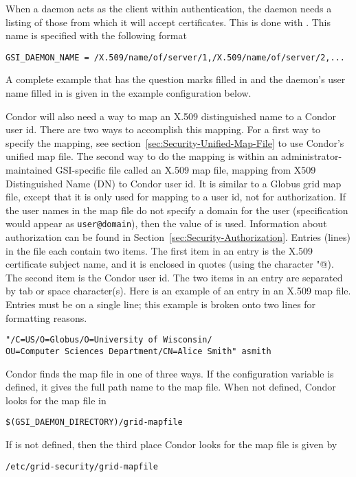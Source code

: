 \begin{description}
When a daemon acts as the client within authentication,
the daemon needs a listing of those from which it
will accept certificates.
This is done with .
This name is specified with the following format
\footnotesize
\begin{verbatim}
GSI_DAEMON_NAME = /X.509/name/of/server/1,/X.509/name/of/server/2,...
\end{verbatim}
\normalsize

A complete example that has the question marks filled in and the
daemon's user name filled in is given in the 
example configuration below.

Condor will also need a way to map an X.509 distinguished
name to a Condor user id.
There are two ways to accomplish this mapping.
For a first way to specify the mapping, see
section~\ref{sec:Security-Unified-Map-File}
to use Condor's unified map file.
The second way to do the mapping is within
an administrator-maintained GSI-specific file called an X.509 map file,
mapping from X509 Distinguished Name (DN) to Condor user id.
It is similar to a Globus grid map file, except that it is only used for
mapping to a user id, not for authorization. 
If the user names in the
map file do not specify a domain for the user
(specification would appear as \verb|user@domain|),
then the value of  is used.
Information about authorization can be found in
Section~\ref{sec:Security-Authorization}. 
Entries (lines) in the file each contain two items.
The first item in an entry is the 
X.509 certificate subject name, and it is enclosed in quotes
(using the character \verb@"@).
The second item is the Condor user id.
The two items in an entry are separated by tab or space character(s).
Here is an example of an entry in an X.509 map file.
Entries must be on a single line; this example is broken
onto two lines for formatting reasons.

\footnotesize
\begin{verbatim}
"/C=US/O=Globus/O=University of Wisconsin/
OU=Computer Sciences Department/CN=Alice Smith" asmith
\end{verbatim}
\normalsize

Condor finds the map file in one of three ways.
If the configuration variable  is defined,
it gives the full path name to the map file.
When not defined,
Condor looks for the map file in 
\begin{verbatim}
$(GSI_DAEMON_DIRECTORY)/grid-mapfile
\end{verbatim}
If  is not defined,
then the third place Condor looks for the map file is given by
\begin{verbatim}
/etc/grid-security/grid-mapfile
\end{verbatim}



\end{description}
